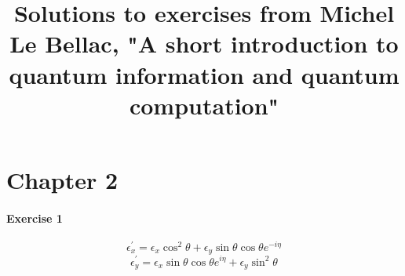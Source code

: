 \documentclass[a4paper]{article}
\title{Solutions to exercises from Michel Le Bellac, "A short introduction to quantum information and quantum computation"}
\date{}
\begin{document}
\maketitle
\tableofcontents

\section{Chapter 2}

\paragraph{Exercise 1}

$$
    \epsilon_{x}^{'} = \epsilon_{x} \cos^{2}\theta + \epsilon_{y} \sin\theta \cos\theta e^{-i \eta}
$$
$$
    \epsilon_{y}^{'} = \epsilon_{x} \sin\theta \cos\theta e^{i \eta} + \epsilon_{y} \sin^{2}\theta
$$
\end{document}
